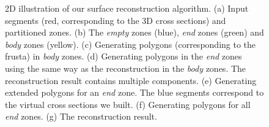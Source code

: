 \begin{figure} [htbp]
{\begin{minipage}[b]{0.23\textwidth}
    \end{minipage}}
  \caption{2D illustration of our surface reconstruction algorithm.
  (a) Input segments (red, corresponding to the 3D cross sections) and partitioned zones.
  (b) The \textit{empty} zones (blue), \textit{end} zones (green) and \textit{body} zones (yellow).
  (c) Generating polygons (corresponding to the frusta) in \textit{body} zones.
  (d) Generating polygons in the \textit{end} zones using the same way as the reconstruction in the \textit{body} zones. The reconstruction result contains multiple components.
  (e) Generating extended polygons for an \textit{end} zone. The blue segments correspond to the virtual cross sections we built.
  (f) Generating polygons for all \textit{end} zones.
  (g) The reconstruction result. }
  \label{fig:workflow2d}
\end{figure}

